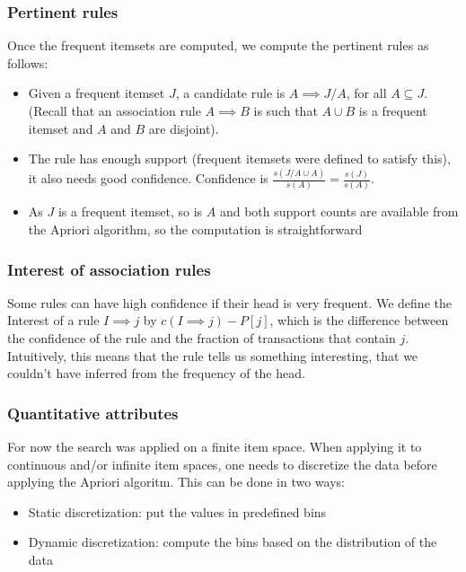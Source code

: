 \subsubsection{Pertinent rules}
Once the frequent itemsets are computed, we compute the pertinent rules as follows:
\begin{itemize}
\item Given a frequent itemset $J$, a candidate rule is $A \implies J/A$, for all $A \subseteq J$. (Recall that an association rule $A \implies B$ is such that $A \cup B$ is a frequent itemset and $A$ and $B$ are disjoint).
\item The rule has enough support (frequent itemsets were defined to satisfy this), it also needs good confidence. Confidence is $\frac{s(J/A \cup A)}{s(A)} = \frac{s(J)}{s(A)}$.
\item As $J$ is a frequent itemset, so is $A$ and both support counts are available from the Apriori algorithm, so the computation is straightforward
\end{itemize}

\subsubsection{Interest of association rules}
Some rules can have high confidence if their head is very frequent.
We define the Interest of a rule $I \implies j$ by $c(I \implies j) - P[j]$, which is the difference between the confidence of the rule and the fraction of transactions that contain $j$.
Intuitively, this means that the rule tells us something interesting, that we couldn't have inferred from the frequency of the head.

\subsubsection{Quantitative attributes}
For now the search was applied on a finite item space. When applying it to continuous and/or infinite item spaces, one needs to discretize the data before applying the Apriori algoritm. This can be done in two ways:
\begin{itemize}
\item Static discretization: put the values in predefined bins
\item Dynamic discretization: compute the bins based on the distribution of the data
\end{itemize}

